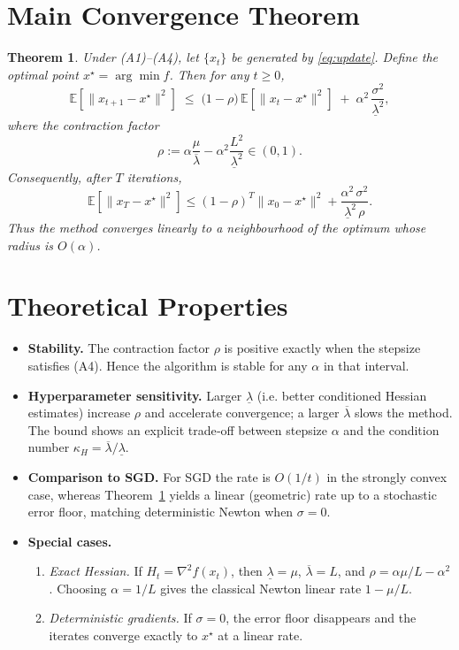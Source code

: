 \documentclass{article}
\newtheorem{theorem}{Theorem}
\newcommand{\E}{\mathbb{E}}
\begin{document}
\section*{Main Convergence Theorem}
\begin{theorem}
\label{thm:linear}
Under (A1)–(A4), let $\{x_{t}\}$ be generated by \eqref{eq:update}. Define the optimal point $x^{\star}=\arg\min f$. Then for any $t\ge0$,
\begin{equation}
\label{eq:linear-rate}
\E\!\left[\|x_{t+1}-x^{\star}\|^{2}\right]
\;\le\;
\bigl(1-\rho\bigr)\,\E\!\left[\|x_{t}-x^{\star}\|^{2}\right]
\;+\;
\alpha^{2}\,\frac{\sigma^{2}}{\underline{\lambda}^{2}},
\end{equation}
where the contraction factor
\[
\rho:=\alpha\frac{\mu}{\overline{\lambda}}-\alpha^{2}\frac{L^{2}}{\underline{\lambda}^{2}}
\in(0,1).
\]
Consequently, after $T$ iterations,
\[
\E\!\left[\|x_{T}-x^{\star}\|^{2}\right]
\le (1-\rho)^{T}\|x_{0}-x^{\star}\|^{2}
   +\frac{\alpha^{2}\,\sigma^{2}}{\underline{\lambda}^{2}\,\rho}.
\]
Thus the method converges linearly to a neighbourhood of the optimum whose radius is $O(\alpha)$.
\end{theorem}

\section*{Theoretical Properties}
\begin{itemize}
\item \textbf{Stability.} The contraction factor $\rho$ is positive exactly when the stepsize satisfies (A4). Hence the algorithm is stable for any $\alpha$ in that interval.

\item \textbf{Hyperparameter sensitivity.} Larger $\underline{\lambda}$ (i.e. better conditioned Hessian estimates) increase $\rho$ and accelerate convergence; a larger $\overline{\lambda}$ slows the method. The bound shows an explicit trade‑off between stepsize $\alpha$ and the condition number $\kappa_{H}=\overline{\lambda}/\underline{\lambda}$.

\item \textbf{Comparison to SGD.} For SGD the rate is $O(1/t)$ in the strongly convex case, whereas Theorem~\ref{thm:linear} yields a linear (geometric) rate up to a stochastic error floor, matching deterministic Newton when $\sigma=0$.

\item \textbf{Special cases.}
    \begin{enumerate}
        \item \emph{Exact Hessian.} If $H_{t}=\nabla^{2}f(x_{t})$, then $\underline{\lambda}=\mu$, $\overline{\lambda}=L$, and $\rho=\alpha\mu/L-\alpha^{2}$. Choosing $\alpha=1/L$ gives the classical Newton linear rate $1-\mu/L$.
        \item \emph{Deterministic gradients.} If $\sigma=0$, the error floor disappears and the iterates converge exactly to $x^{\star}$ at a linear rate.
    \end{enumerate}
\end{itemize}
\end{document}
